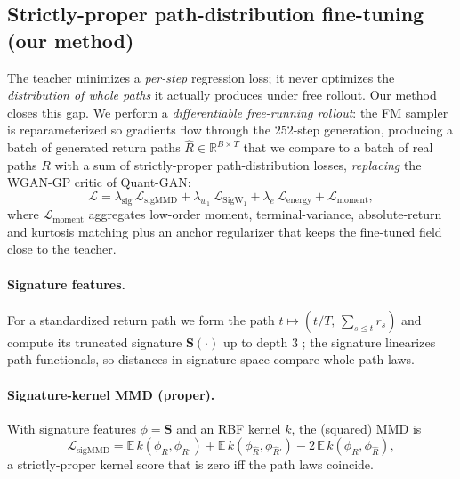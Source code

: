 \documentclass[11pt]{article}
\newcommand{\E}{\mathbb{E}}
\newcommand{\R}{\mathbb{R}}
\begin{document}
\subsection{Strictly-proper path-distribution fine-tuning (our method)}
\label{sec:pathloss}
The teacher minimizes a \emph{per-step} regression loss; it never optimizes the
\emph{distribution of whole paths} it actually produces under free rollout. Our
method closes this gap. We perform a \emph{differentiable free-running rollout}:
the FM sampler is reparameterized so gradients flow through the $252$-step
generation, producing a batch of generated return paths
$\hat R\in\R^{B\times T}$ that we compare to a batch of real paths $R$ with a sum
of strictly-proper \citep{gneiting2007strictly} path-distribution losses,
\emph{replacing} the WGAN-GP critic of Quant-GAN:
\begin{equation}
\mathcal L
= \lambda_{\mathrm{sig}}\,\mathcal L_{\mathrm{sigMMD}}
+ \lambda_{w_1}\,\mathcal L_{\mathrm{SigW_1}}
+ \lambda_{e}\,\mathcal L_{\mathrm{energy}}
+ \mathcal L_{\mathrm{moment}} ,
\end{equation}
where $\mathcal L_{\mathrm{moment}}$ aggregates low-order moment, terminal-variance,
absolute-return and kurtosis matching plus an anchor regularizer that keeps the
fine-tuned field close to the teacher.

\paragraph{Signature features.} For a standardized return path we form the path
$t\mapsto(t/T,\,\sum_{s\le t}r_s)$ and compute its truncated signature
$\mathbf S(\cdot)$ up to depth $3$ \citep{lyons2007differential}; the signature
linearizes path functionals, so distances in signature space compare whole-path
laws.

\paragraph{Signature-kernel MMD (proper).} With signature features $\phi=\mathbf S$
and an RBF kernel $k$, the (squared) MMD \citep{gretton2012kernel,
salvi2021signature,issa2023nonadversarial} is
\begin{equation}
\mathcal L_{\mathrm{sigMMD}}
= \E\,k(\phi_R,\phi_{R'}) + \E\,k(\phi_{\hat R},\phi_{\hat R'})
- 2\,\E\,k(\phi_R,\phi_{\hat R}),
\end{equation}
a strictly-proper kernel score that is zero iff the path laws coincide.
\end{document}
